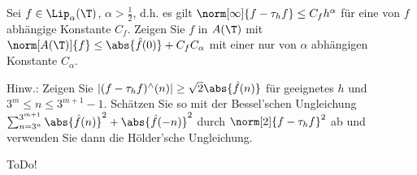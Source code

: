
\begin{exercise}

Sei $f \in \Lip_\alpha(\T)$, $\alpha > \frac{1}{2}$, d.h. es gilt $\norm[\infty]{f - \tau_h f} \leq C_f h^\alpha$ für eine von $f$ abhängige Konstante $C_f$.
Zeigen Sie $f$ in $A(\T)$ mit $\norm[A(\T)]{f} \leq \abs{\hat f(0)} + C_f C_\alpha$ mit einer nur von $\alpha$ abhängigen Konstante $C_\alpha$.

Hinw.:
Zeigen Sie $|(f - \tau_h f)^\wedge(n)| \geq \sqrt 2 \abs{\hat f(n)}$ für geeignetes $h$ und $3^m \leq n \leq 3^{m+1} - 1$.
Schätzen Sie so mit der Bessel'schen Ungleichung $\sum_{n=3^n}^{3^{m+1}} \abs{\hat f(n)}^2 + \abs{\hat f(-n)}^2$ durch $\norm[2]{f - \tau_h f}^2$ ab und verwenden Sie dann die Hölder'sche Ungleichung.

\end{exercise}


\begin{solution}

ToDo!

\end{solution}

